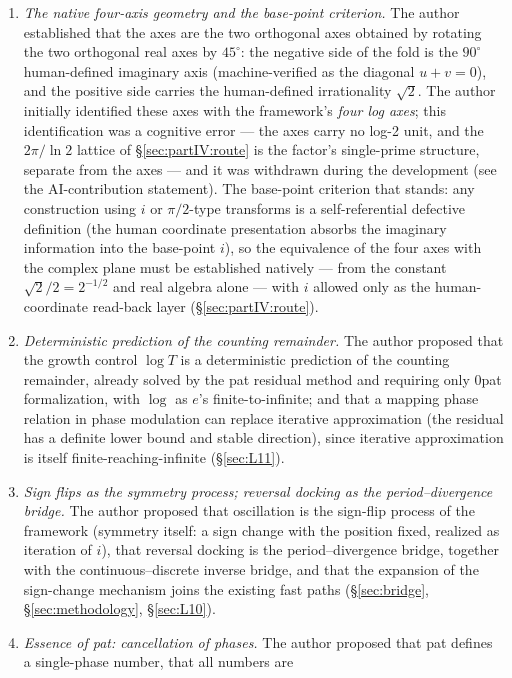 \documentclass{article}
\begin{document}
\begin{enumerate}
(\S\ref{sec:partIV:route}, \S\ref{sec:conclusion}).
\item \emph{The native four-axis geometry and the base-point
criterion.}
The author established that the axes are the two orthogonal axes
obtained by rotating the two orthogonal real axes by $45^\circ$:
the negative side of the fold is the $90^\circ$ human-defined imaginary
axis (machine-verified as the diagonal $u+v=0$), and the positive side
carries the human-defined irrationality $\sqrt2$. The author initially
identified these axes with the framework's \emph{four log axes}; this
identification was a cognitive error --- the axes carry no log-2 unit,
and the $2\pi/\ln 2$ lattice of \S\ref{sec:partIV:route} is the
factor's single-prime structure, separate from the axes --- and it was
withdrawn during the development (see the AI-contribution statement).
The base-point criterion that stands: any construction using $i$ or
$\pi/2$-type transforms is a self-referential defective definition
(the human coordinate presentation absorbs the imaginary information
into the base-point $i$), so the equivalence of the four axes with
the complex plane must be established natively --- from the constant
$\sqrt2/2=2^{-1/2}$ and real algebra alone --- with $i$ allowed only
as the human-coordinate read-back layer (\S\ref{sec:partIV:route}).
\item \emph{Deterministic prediction of the counting remainder.} The author
proposed that the growth control $\log T$ is a deterministic prediction of
the counting remainder, already solved by the pat residual method and
requiring only 0pat formalization, with $\log$ as $e$'s
finite-to-infinite; and that a mapping phase relation in phase modulation
can replace iterative approximation (the residual has a definite lower bound
and stable direction), since iterative approximation is itself
finite-reaching-infinite (\S\ref{sec:L11}).
\item \emph{Sign flips as the symmetry process; reversal docking as the
period--divergence bridge.} The author proposed that oscillation is the
sign-flip process of the framework (symmetry itself: a sign change with the
position fixed, realized as iteration of $i$), that reversal docking is the
period--divergence bridge, together with the continuous--discrete inverse
bridge, and that the expansion of the sign-change mechanism joins the
existing fast paths (\S\ref{sec:bridge}, \S\ref{sec:methodology},
\S\ref{sec:L10}).
\item \emph{Essence of pat: cancellation of phases.} The author proposed
that pat defines a single-phase number, that all numbers are

\end{enumerate}
\end{document}
